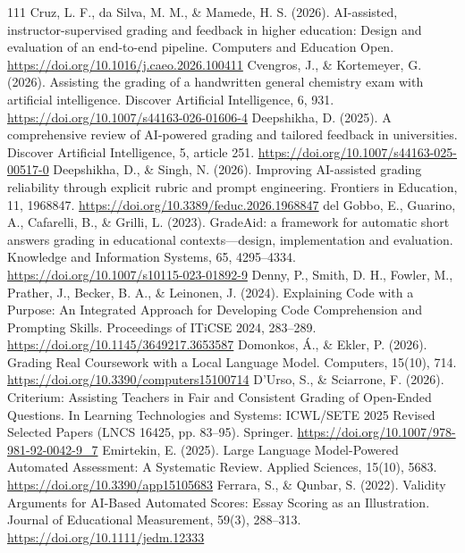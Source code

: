 \begin{thebibliography}{111}
 Cruz, L. F., da Silva, M. M., \& Mamede, H. S. (2026). AI-assisted, instructor-supervised grading and feedback in higher education: Design and evaluation of an end-to-end pipeline. Computers and Education Open. \url{https://doi.org/10.1016/j.caeo.2026.100411}
 Cvengros, J., \& Kortemeyer, G. (2026). Assisting the grading of a handwritten general chemistry exam with artificial intelligence. Discover Artificial Intelligence, 6, 931. \url{https://doi.org/10.1007/s44163-026-01606-4}
 Deepshikha, D. (2025). A comprehensive review of AI-powered grading and tailored feedback in universities. Discover Artificial Intelligence, 5, article 251. \url{https://doi.org/10.1007/s44163-025-00517-0}
 Deepshikha, D., \& Singh, N. (2026). Improving AI-assisted grading reliability through explicit rubric and prompt engineering. Frontiers in Education, 11, 1968847. \url{https://doi.org/10.3389/feduc.2026.1968847}
 del Gobbo, E., Guarino, A., Cafarelli, B., \& Grilli, L. (2023). GradeAid: a framework for automatic short answers grading in educational contexts---design, implementation and evaluation. Knowledge and Information Systems, 65, 4295--4334. \url{https://doi.org/10.1007/s10115-023-01892-9}
 Denny, P., Smith, D. H., Fowler, M., Prather, J., Becker, B. A., \& Leinonen, J. (2024). Explaining Code with a Purpose: An Integrated Approach for Developing Code Comprehension and Prompting Skills. Proceedings of ITiCSE 2024, 283--289. \url{https://doi.org/10.1145/3649217.3653587}
 Domonkos, \'{A}., \& Ekler, P. (2026). Grading Real Coursework with a Local Language Model. Computers, 15(10), 714. \url{https://doi.org/10.3390/computers15100714}
 D'Urso, S., \& Sciarrone, F. (2026). Criterium: Assisting Teachers in Fair and Consistent Grading of Open-Ended Questions. In Learning Technologies and Systems: ICWL/SETE 2025 Revised Selected Papers (LNCS 16425, pp. 83--95). Springer. \url{https://doi.org/10.1007/978-981-92-0042-9_7}
 Emirtekin, E. (2025). Large Language Model-Powered Automated Assessment: A Systematic Review. Applied Sciences, 15(10), 5683. \url{https://doi.org/10.3390/app15105683}
 Ferrara, S., \& Qunbar, S. (2022). Validity Arguments for AI-Based Automated Scores: Essay Scoring as an Illustration. Journal of Educational Measurement, 59(3), 288--313. \url{https://doi.org/10.1111/jedm.12333}

\end{thebibliography}
